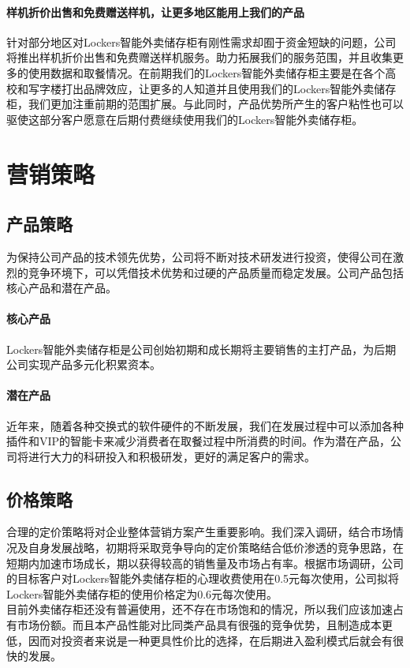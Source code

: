 \documentclass[violet]{main}
\begin{document}
				\paragraph{样机折价出售和免费赠送样机，让更多地区能用上我们的产品}
					针对部分地区对Lockers智能外卖储存柜有刚性需求却囿于资金短缺的问题，公司将推出样机折价出售和免费赠送样机服务。助力拓展我们的服务范围，并且收集更多的使用数据和取餐情况。在前期我们的Lockers智能外卖储存柜主要是在各个高校和写字楼打出品牌效应，让更多的人知道并且使用我们的Lockers智能外卖储存柜，我们更加注重前期的范围扩展。与此同时，产品优势所产生的客户粘性也可以驱使这部分客户愿意在后期付费继续使用我们的Lockers智能外卖储存柜。
		\section{营销策略}
			\subsection{产品策略}
				为保持公司产品的技术领先优势，公司将不断对技术研发进行投资，使得公司在激烈的竞争环境下，可以凭借技术优势和过硬的产品质量而稳定发展。公司产品包括核心产品和潜在产品。
				\paragraph{核心产品}
					Lockers智能外卖储存柜是公司创始初期和成长期将主要销售的主打产品，为后期公司实现产品多元化积累资本。
				\paragraph{潜在产品}
					近年来，随着各种交换式的软件硬件的不断发展，我们在发展过程中可以添加各种插件和VIP的智能卡来减少消费者在取餐过程中所消费的时间。作为潜在产品，公司将进行大力的科研投入和积极研发，更好的满足客户的需求。
			\subsection{价格策略}
				合理的定价策略将对企业整体营销方案产生重要影响。我们深入调研，结合市场情况及自身发展战略，初期将采取竞争导向的定价策略结合低价渗透的竞争思路，在短期内加速市场成长，期以获得较高的销售量及市场占有率。根据市场调研，公司的目标客户对Lockers智能外卖储存柜的心理收费使用在0.5元每次使用，公司拟将Lockers智能外卖储存柜的使用价格定为0.6元每次使用。 
				\\\indent 目前外卖储存柜还没有普遍使用，还不存在市场饱和的情况，所以我们应该加速占有市场份额。而且本产品性能对比同类产品具有很强的竞争优势，且制造成本更低，因而对投资者来说是一种更具性价比的选择，在后期进入盈利模式后就会有很快的发展。
\end{document}
